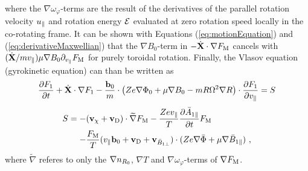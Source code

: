 where the $\nabla \omega_\varphi$-terms are the result of the derivatives of the parallel rotation velocity $u_\parallel$ and rotation energy $\mathcal{E}$ evaluated at zero rotation speed locally in the co-rotating frame. \cite{Peeters2009B} It can be shown with Equations (\ref{eq:motionEquation}) and (\ref{eq:derivativeMaxwellian}) that the $\nabla B_0$-term in $-\dot{\boldsymbol{\mathbf{X}}}\cdot \nabla F_\mathrm{M}$ cancels with $(\dot{\boldsymbol{\mathbf{X}}}/m v_\parallel) \mu \nabla B_0 \partial_{v_\parallel} F_\mathrm{M}$ for purely toroidal rotation. Finally, the Vlasov equation (gyrokinetic equation) can than be written as 
\begin{gather*}
	\frac{\partial F_1}{\partial t} + \dot{\boldsymbol{\mathbf{X}}} \cdot \nabla F_1 - \frac{\boldsymbol{\mathbf{b}}_0}{m} \cdot \left(Ze\nabla \Phi_0 + \mu \nabla B_0 - mR \Omega^2 \nabla R \right) \cdot \frac{\partial F_1}{\partial v_\parallel} = S
\end{gather*}
\begin{gather}
	\begin{aligned}
		S = -& (\boldsymbol{\mathbf{v}}_\chi + \boldsymbol{\mathbf{v}}_\mathrm{D}) \cdot \widetilde{\nabla} F_\mathrm{M} - \frac{Z e v_\parallel}{T}  \frac{\partial \bar{A}_{1\parallel}}{\partial t} F_\mathrm{M} \\
		    -& \frac{F_\mathrm{M}}{T} (v_\parallel \boldsymbol{\mathbf{b}}_0 + \boldsymbol{\mathbf{v}}_\mathrm{D} + \boldsymbol{\mathbf{v}}_{\bar{B}_{1\perp}}) \cdot (Z e \nabla \bar{\Phi} + \mu \nabla \bar{B}_{1\parallel})~,
	\end{aligned}
	\label{eq:gyrocenterDeltafSubVlasovSourceTerm}
\end{gather}
where $\widetilde{\nabla}$ referes to only the $\nabla n_{R_0}$, $\nabla T$ and $\nabla \omega_\varphi$-terms of $\nabla F_\mathrm{M}$. \bigskip

\newpage